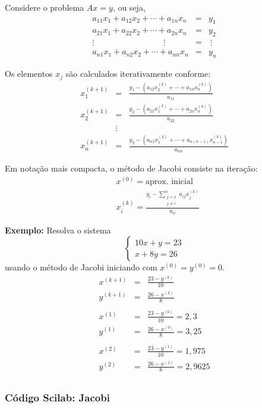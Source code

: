 Considere o problema $Ax=y$, ou seja,
\begin{eqnarray*}
a_{11}x_1+a_{12}x_2+\cdots+a_{1n}x_n&=&y_1\\
a_{21}x_1+a_{22}x_2+\cdots+a_{2n}x_n&=&y_2\\
\vdots \hspace{100pt}\vdots~~~~&=&~\vdots\\
a_{n1}x_1+a_{n2}x_2+\cdots+a_{nn}x_n&=&y_n
\end{eqnarray*}

Os elementos $x_j$ são calculados iterativamente conforme:
\begin{eqnarray*}
x_1^{(k+1)}&=& \frac{y_1 - \left(a_{12}x_2^{(k)}+\cdots+a_{1n}x_n^{(k)}\right)}{a_{11}}\\
x_2^{(k+1)}&=&\frac{y_2 - \left(a_{21}x_1^{(k)}+\cdots+a_{2n}x_n^{(k)}\right)}{a_{22}}\\
&\vdots&\\
x_n^{(k+1)}&=&\frac{y_2 - \left(a_{n1}x_1^{(k)}+\cdots+a_{n(n-1)}x_{n-1}^{(k)}\right)}{a_{nn}}
\end{eqnarray*}

Em notação mais compacta, o método de Jacobi consiste na iteração:
\begin{align*}
  &x^{(0)} = \text{aprox. inicial}\\
  &x_i^{(k)} = \frac{y_i - \displaystyle{\sum_{\substack{j=1\\j\neq i}}^{n} a_{ij}x_j^{(k)}}}{a_{ii}}
\end{align*}

{\bf Exemplo:} Resolva o sistema $$\left\{\begin{array}{l}10x+y=23\\x+8y=26\end{array}\right.$$
usando o método de Jacobi iniciando com $x^{(0)}=y^{(0)}=0$.
\begin{eqnarray*}
x^{(k+1)}&=&\frac{23-y^{(k)}}{10}\\
y^{(k+1)}&=&\frac{26-x^{(k)}}{8}\\
\\
x^{(1)}&=&\frac{23-y^{(0)}}{10}=2,3\\
y^{(1)}&=&\frac{26-x^{(0)}}{8}=3,25\\
\\
x^{(2)}&=&\frac{23-y^{(1)}}{10}=1,975 \\
y^{(2)}&=&\frac{26-x^{(1)}}{8}=2,9625\\
\end{eqnarray*}

\ifisscilab
\subsubsection{Código Scilab: Jacobi}

